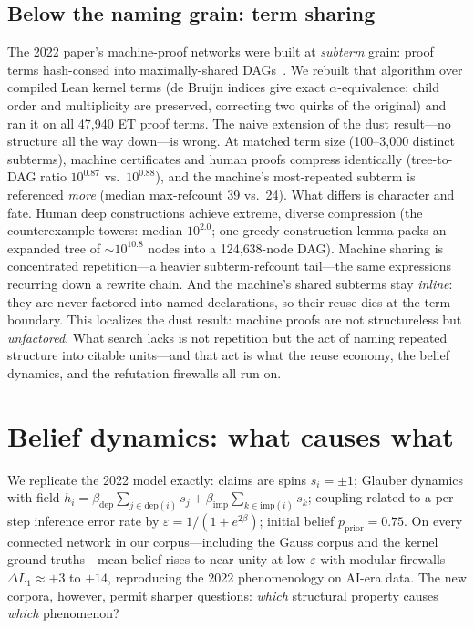 \documentclass[11pt]{article}
\newcommand{\eps}{\varepsilon}
\newcommand{\betadep}{\beta_{\mathrm{dep}}}
\newcommand{\betaimp}{\beta_{\mathrm{imp}}}
\begin{document}
\subsection{Below the naming grain: term sharing}
\label{sec:subterm}

The 2022 paper's machine-proof networks were built at \emph{subterm} grain: proof terms
hash-consed into maximally-shared DAGs~\cite{mpt}. We rebuilt that algorithm over compiled Lean
kernel terms (de Bruijn indices give exact $\alpha$-equivalence; child order and multiplicity are
preserved, correcting two quirks of the original) and ran it on all 47{,}940 ET proof terms. The
naive extension of the dust result---no structure all the way down---is wrong. At matched term
size (100--3{,}000 distinct subterms), machine certificates and human proofs compress identically
(tree-to-DAG ratio $10^{0.87}$ vs.\ $10^{0.88}$), and the machine's most-repeated subterm is
referenced \emph{more} (median max-refcount 39 vs.\ 24). What differs is character and fate.
Human deep constructions achieve extreme, diverse compression (the counterexample towers: median
$10^{2.0}$; one greedy-construction lemma packs an expanded tree of $\sim\!10^{10.8}$ nodes into
a 124{,}638-node DAG). Machine sharing is concentrated repetition---a heavier subterm-refcount
tail---the same expressions recurring down a rewrite chain. And the machine's shared subterms
stay \emph{inline}: they are never factored into named declarations, so their reuse dies at the
term boundary. This localizes the dust result: machine proofs are not structureless but
\emph{unfactored}. What search lacks is not repetition but the act of naming repeated structure
into citable units---and that act is what the reuse economy, the belief dynamics, and the
refutation firewalls all run on.

\section{Belief dynamics: what causes what}
\label{sec:ising}

We replicate the 2022 model exactly: claims are spins $s_i = \pm 1$; Glauber dynamics with
field $h_i = \betadep \sum_{j \in \mathrm{dep}(i)} s_j + \betaimp \sum_{k \in \mathrm{imp}(i)} s_k$;
coupling related to a per-step inference error rate by $\eps = 1/(1 + e^{2\beta})$; initial
belief $p_{\mathrm{prior}} = 0.75$. On every connected network in our corpus---including the
Gauss corpus and the kernel ground truths---mean belief rises to near-unity at low $\eps$
with modular firewalls $\Delta L_1 \approx +3$ to $+14$, reproducing the 2022 phenomenology on
AI-era data. The new corpora, however, permit sharper questions: \emph{which} structural
property causes \emph{which} phenomenon?
\end{document}
